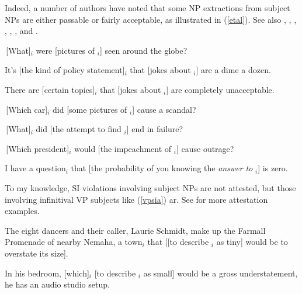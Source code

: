 \documentclass[output=paper]{langsci/langscibook}
\begin{document}
\noindent
Indeed, a   number of authors  have noted that some NP extractions from subject NPs are either passable or
 fairly acceptable,   as illustrated  in (\ref{etal}). See also
 \citet[195,ft.32]{pollardsag},
 \citet{postal98},
  \citet[304]{sauerelb},   
  \citet[230]{culicover99},
  \citet[265]{levhubook},  \citet[470,471]{chavesextr},
and \citet{chavesjeruen}.

  
\ea

\ea \,[What]$_i$ were [pictures of \spc$_i$] seen around the globe?\\
  \citep[268]{kluender} 


\ex It's [the kind of policy statement]$_i$ that [jokes about \spc$_i$] are a dime a dozen.\\
\citep[204]{levineetal}


\ex There are [certain topics]$_i$ that [jokes about \spc$_i$] are completely unacceptable.\\
\citep[252, ft.6]{Levine:Sag:03}

\ex  \,[Which car]$_i$ did [some pictures of \spc$_i$] cause a scandal?\\
 \citep[111]{fernandez}
 
 \ex \,[What]$_i$ did [the attempt to find \spc$_i$] end in failure?\\
 \citep[370]{hofsaglang}
 
 \ex  \,[Which president]$_i$ would [the  impeachment of \spc$_i$] cause  outrage?\\
 \citep{chavesextr}
 
 \ex I have a question$_i$ that [the probability of you knowing the {\slshape answer to} \spc$_i$] is zero.\\
\citep{chavessubj}

\z \label{etal}
\z



To my knowledge, SI violations involving subject NPs are not attested, but those involving
infinitival VP subjects like  (\ref{vpsia}) ar.
See  \citet[471]{chavesextr} for more attestation examples.


\ea
\ea The eight dancers and their caller, Laurie Schmidt, make up the
Farmall Promenade of nearby Nemaha, a town$_i$
that [[to describe \spc$_i$ as tiny] would be to overstate its size]. \\
 \citep[1094, ft.27]{hud12} 

\ex In his bedroom, [which]$_i$ [to describe \spc$_i$ as small] would be
 a gross understatement, he has an audio studio setup.
\end{document}
